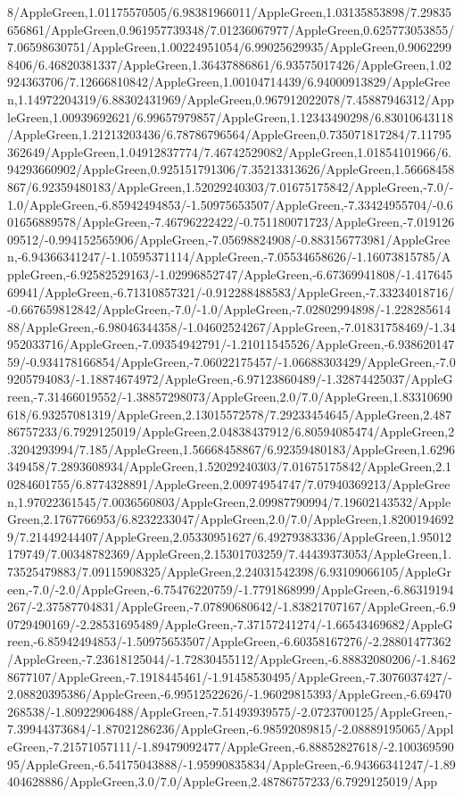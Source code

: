 {\begin{tikzternal}
8/AppleGreen,1.01175570505/6.98381966011/AppleGreen,1.03135853898/7.29835656861/AppleGreen,0.961957739348/7.01236067977/AppleGreen,0.625773053855/7.06598630751/AppleGreen,1.00224951054/6.99025629935/AppleGreen,0.90622998406/6.46820381337/AppleGreen,1.36437886861/6.93575017426/AppleGreen,1.02924363706/7.12666810842/AppleGreen,1.00104714439/6.94000913829/AppleGreen,1.14972204319/6.88302431969/AppleGreen,0.967912022078/7.45887946312/AppleGreen,1.00939692621/6.99657979857/AppleGreen,1.12343490298/6.83010643118/AppleGreen,1.21213203436/6.78786796564/AppleGreen,0.735071817284/7.11795362649/AppleGreen,1.04912837774/7.46742529082/AppleGreen,1.01854101966/6.94293660902/AppleGreen,0.925151791306/7.35213313626/AppleGreen,1.56668458867/6.92359480183/AppleGreen,1.52029240303/7.01675175842/AppleGreen,-7.0/-1.0/AppleGreen,-6.85942494853/-1.50975653507/AppleGreen,-7.33424955704/-0.601656889578/AppleGreen,-7.46796222422/-0.751180071723/AppleGreen,-7.01912609512/-0.994152565906/AppleGreen,-7.05698824908/-0.883156773981/AppleGreen,-6.94366341247/-1.10595371114/AppleGreen,-7.05534658626/-1.16073815785/AppleGreen,-6.92582529163/-1.02996852747/AppleGreen,-6.67369941808/-1.41764569941/AppleGreen,-6.71310857321/-0.912288488583/AppleGreen,-7.33234018716/-0.667659812842/AppleGreen,-7.0/-1.0/AppleGreen,-7.02802994898/-1.22828561488/AppleGreen,-6.98046344358/-1.04602524267/AppleGreen,-7.01831758469/-1.34952033716/AppleGreen,-7.09354942791/-1.21011545526/AppleGreen,-6.93862014759/-0.934178166854/AppleGreen,-7.06022175457/-1.06688303429/AppleGreen,-7.09205794083/-1.18874674972/AppleGreen,-6.97123860489/-1.32874425037/AppleGreen,-7.31466019552/-1.38857298073/AppleGreen,2.0/7.0/AppleGreen,1.83310690618/6.93257081319/AppleGreen,2.13015572578/7.29233454645/AppleGreen,2.48786757233/6.7929125019/AppleGreen,2.04838437912/6.80594085474/AppleGreen,2.3204293994/7.185/AppleGreen,1.56668458867/6.92359480183/AppleGreen,1.6296349458/7.2893608934/AppleGreen,1.52029240303/7.01675175842/AppleGreen,2.10284601755/6.8774328891/AppleGreen,2.00974954747/7.07940369213/AppleGreen,1.97022361545/7.0036560803/AppleGreen,2.09987790994/7.19602143532/AppleGreen,2.1767766953/6.8232233047/AppleGreen,2.0/7.0/AppleGreen,1.82001946929/7.21449244407/AppleGreen,2.05330951627/6.49279383336/AppleGreen,1.95012179749/7.00348782369/AppleGreen,2.15301703259/7.44439373053/AppleGreen,1.73525479883/7.09115908325/AppleGreen,2.24031542398/6.93109066105/AppleGreen,-7.0/-2.0/AppleGreen,-6.75476220759/-1.7791868999/AppleGreen,-6.86319194267/-2.37587704831/AppleGreen,-7.07890680642/-1.83821707167/AppleGreen,-6.90729490169/-2.28531695489/AppleGreen,-7.37157241274/-1.66543469682/AppleGreen,-6.85942494853/-1.50975653507/AppleGreen,-6.60358167276/-2.28801477362/AppleGreen,-7.23618125044/-1.72830455112/AppleGreen,-6.88832080206/-1.84628677107/AppleGreen,-7.1918445461/-1.91458530495/AppleGreen,-7.3076037427/-2.08820395386/AppleGreen,-6.99512522626/-1.96029815393/AppleGreen,-6.69470268538/-1.80922906488/AppleGreen,-7.51493939575/-2.0723700125/AppleGreen,-7.39944373684/-1.87021286236/AppleGreen,-6.98592089815/-2.08889195065/AppleGreen,-7.21571057111/-1.89479092477/AppleGreen,-6.88852827618/-2.10036959095/AppleGreen,-6.54175043888/-1.95990835834/AppleGreen,-6.94366341247/-1.89404628886/AppleGreen,3.0/7.0/AppleGreen,2.48786757233/6.7929125019/App
\end{tikzternal}}
